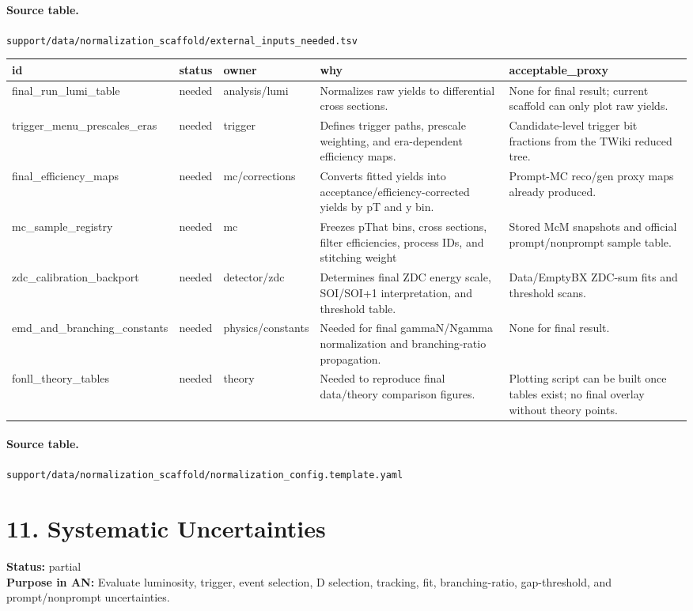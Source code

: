 \documentclass[11pt]{article}
\begin{document}
\paragraph{Source table.} \texttt{support/data/normalization\_scaffold/external\_inputs\_needed.tsv}
\begin{center}\scriptsize
\begin{tabular}{|l|l|l|l|l|}
\hline
id & status & owner & why & acceptable\_proxy \\ \hline
final\_run\_lumi\_table & needed & analysis/lumi & Normalizes raw yields to differential cross sections. & None for final result; current scaffold can only plot raw yields. \\ \hline
trigger\_menu\_prescales\_eras & needed & trigger & Defines trigger paths, prescale weighting, and era-dependent efficiency maps. & Candidate-level trigger bit fractions from the TWiki reduced tree. \\ \hline
final\_efficiency\_maps & needed & mc/corrections & Converts fitted yields into acceptance/efficiency-corrected yields by pT and y bin. & Prompt-MC reco/gen proxy maps already produced. \\ \hline
mc\_sample\_registry & needed & mc & Freezes pThat bins, cross sections, filter efficiencies, process IDs, and stitching weight & Stored McM snapshots and official prompt/nonprompt sample table. \\ \hline
zdc\_calibration\_backport & needed & detector/zdc & Determines final ZDC energy scale, SOI/SOI+1 interpretation, and threshold table. & Data/EmptyBX ZDC-sum fits and threshold scans. \\ \hline
emd\_and\_branching\_constants & needed & physics/constants & Needed for final gammaN/Ngamma normalization and branching-ratio propagation. & None for final result. \\ \hline
fonll\_theory\_tables & needed & theory & Needed to reproduce final data/theory comparison figures. & Plotting script can be built once tables exist; no final overlay without theory points. \\ \hline
\end{tabular}
\end{center}
\paragraph{Source table.} \texttt{support/data/normalization\_scaffold/normalization\_config.template.yaml}
\section*{11. Systematic Uncertainties}
\textbf{Status:} partial\\
\textbf{Purpose in AN:} Evaluate luminosity, trigger, event selection, D selection, tracking, fit, branching-ratio, gap-threshold, and prompt/nonprompt uncertainties.
\end{document}
